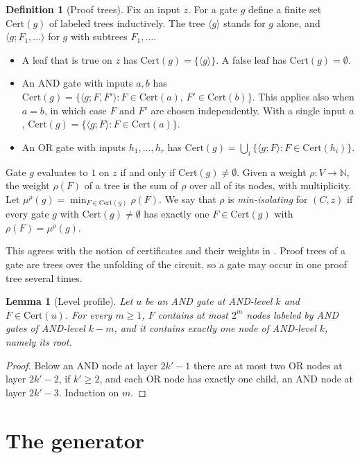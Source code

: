 \documentclass[11pt,letterpaper]{article}
\newtheorem{lemma}[theorem]{Lemma}
\theoremstyle{definition}
\newtheorem{definition}[theorem]{Definition}
\theoremstyle{remark}
\newcommand{\N}{\mathbb N}
\newcommand{\Cert}{\mathrm{Cert}}
\begin{document}
\begin{definition}[Proof trees]\label{def:cert}
Fix an input $z$. For a gate $g$ define a finite set $\Cert(g)$ of labeled
trees inductively. The tree $\langle g\rangle$ stands for $g$ alone, and
$\langle g;F_1,\dots\rangle$ for $g$ with subtrees $F_1,\dots$.
\begin{itemize}
\item A leaf that is true on $z$ has $\Cert(g)=\{\langle g\rangle\}$. A false
 leaf has $\Cert(g)=\emptyset$.
\item An AND gate with inputs $a,b$ has $\Cert(g)=\{\langle g;F,F'\rangle: F\in\Cert(a),\,F'\in\Cert(b)\}$.
 This applies also when $a=b$, in which case $F$ and $F'$ are chosen independently.
 With a single input $a$, $\Cert(g)=\{\langle g;F\rangle:F\in\Cert(a)\}$.
\item An OR gate with inputs $h_1,\dots,h_r$ has $\Cert(g)=\bigcup_i \{\langle g;F\rangle: F\in\Cert(h_i)\}$.
\end{itemize}
Gate $g$ evaluates to $1$ on $z$ if and only if $\Cert(g)\neq\emptyset$.
Given a weight $\rho\colon V\to\N$, the weight $\rho(F)$ of a tree is the sum
of $\rho$ over all of its nodes, with multiplicity. Let
$\mu^\rho(g)=\min_{F\in\Cert(g)}\rho(F)$. We say that $\rho$ is
\emph{min-isolating} for $(C,z)$ if every gate $g$ with $\Cert(g)\ne\emptyset$
has exactly one $F\in\Cert(g)$ with $\rho(F)=\mu^\rho(g)$.
\end{definition}

This agrees with the notion of certificates and their weights in
\cite[Definition~6]{vMP}. Proof trees of a gate are trees over the unfolding
of the circuit, so a gate may occur in one proof tree several times.

\begin{lemma}[Level profile]\label{lem:profile}
Let $u$ be an AND gate at AND-level $k$ and $F\in\Cert(u)$. For every $m\ge1$, $F$
contains at most $2^m$ nodes labeled by AND gates of AND-level $k-m$, and it contains exactly one
node of AND-level $k$, namely its root.
\end{lemma}
\begin{proof}
Below an AND node at layer $2k'-1$ there are at most two OR nodes at
layer $2k'-2$, if $k'\ge2$, and each OR node has exactly one child, an AND node at layer
$2k'-3$. Induction on $m$.
\end{proof}

\section{The generator}
\end{document}
